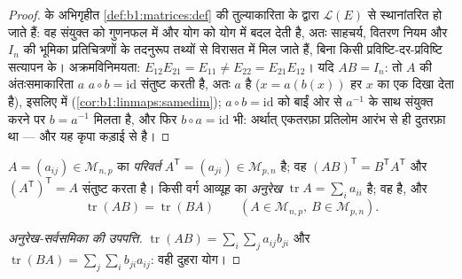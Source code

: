 \begin{proof}
 के अभिगृहीत \cref{def:b1:matrices:def} की तुल्याकारिता के द्वारा
$\mathcal{L}(E)$ से स्थानांतरित हो जाते हैं: वह संयुक्त  को
गुणनफल में और योग को योग में बदल देती है, अतः साहचर्य, वितरण नियम और $I_n$
की भूमिका प्रतिचित्रणों के तदनुरूप तथ्यों से विरासत में मिल जाते हैं, बिना
किसी प्रविष्टि-दर-प्रविष्टि सत्यापन के। अक्रमविनिमयता: $E_{12}E_{21} =
E_{11} \neq E_{22} = E_{21}E_{12}$। यदि $AB = I_n$: तो $A$ की अंतःसमाकारिता
$a$ $a \circ b = \mathrm{id}$ संतुष्ट करती है, अतः $a$  है ($x =
a(b(x))$ हर $x$ का एक  दिखा देता है), इसलिए  में
 (\cref{cor:b1:linmaps:samedim}); $a \circ b = \mathrm{id}$ को
बाईं ओर से $a^{-1}$ के साथ संयुक्त करने पर $b = a^{-1}$ मिलता है, और फिर
$b\circ a = \mathrm{id}$ भी: अर्थात् एकतरफ़ा प्रतिलोम आरंभ से ही दुतरफ़ा था
--- और यह कृपा कड़ाई से  है।
\end{proof}

\begin{definition}[परिवर्त; अनुरेख]\label{def:b1:matrices:transpose}
$A = (a_{ij}) \in \mathcal{M}_{n,p}$ का \emph{परिवर्त} $A^{\mathsf T} =
(a_{ji}) \in \mathcal{M}_{p,n}$ है; वह $(AB)^{\mathsf T} = B^{\mathsf T}
A^{\mathsf T}$ और $(A^{\mathsf T})^{\mathsf T} = A$ संतुष्ट करता है। किसी
वर्ग आव्यूह का \emph{अनुरेख} $\operatorname{tr} A = \sum_i
a_{ii}$ है; वह  है, और
\[
\operatorname{tr}(AB) = \operatorname{tr}(BA)
\qquad (A \in \mathcal{M}_{n,p},\ B \in \mathcal{M}_{p,n}).
\]
\end{definition}

\begin{proof}[अनुरेख-सर्वसमिका की उपपत्ति]
$\operatorname{tr}(AB) = \sum_i \sum_j a_{ij} b_{ji}$ और
$\operatorname{tr}(BA) = \sum_j \sum_i b_{ji} a_{ij}$: वही दुहरा योग।
\end{proof}

